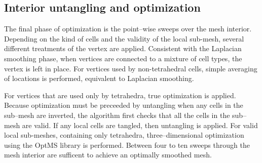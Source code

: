 \documentclass[a4paper,12pt,notitlepage]{article}
\begin{document}
\subsection{Interior untangling and optimization}
The final phase of optimization is the point--wise sweeps over the mesh
interior.   Depending on the kind of cells and the validity of the local sub-mesh, several different treatments of the vertex are applied. Consistent with the Laplacian smoothing phase, when vertices are connected to a mixture of cell types, the vertex is
left in place.  For vertices used by non-tetrahedral cells, simple averaging of locations is performed, equivalent to Laplacian smoothing.

For vertices that are used only by tetrahedra, true optimization is applied.  Because optimization must be preceeded by untangling when any
cells in the sub--mesh are inverted, the algorithm first checks that all
the cells in the sub--mesh are valid.  If any local cells are tangled,
then untangling is applied.   For valid local sub-meshes, containing only tetrahedra,
three--dimensional optimization using the OptMS library is
performed.  Between four to ten sweeps through the mesh interior are sufficent to achieve an optimally smoothed mesh.


%
%

\end{document}

